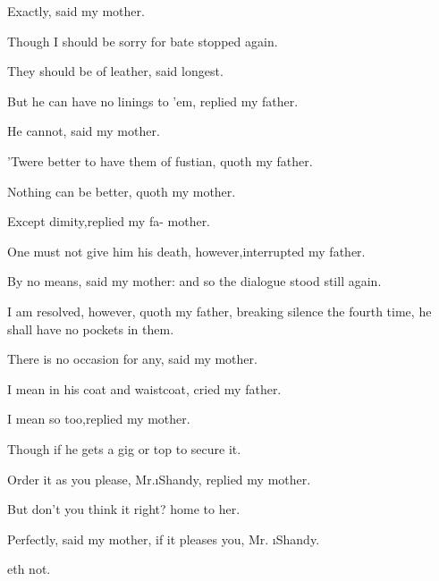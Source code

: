 \documentclass[twoside]{article}
\begin{document}
Exactly, said my mother.\tsh

\tshh Though I should be sorry for\break
{}
bate stopped again.

\tshh They should be of leather, said\break
{}
\parskip 10pt
longest.

But he can have no linings to ’em,\break
replied my father.\tsh

He cannot, said my mother.

’Twere better to have them of fustian,\break
quoth my father.

Nothing can be better, quoth my\break
mother.\tsh

\tshh Except dimity,\tsk replied my fa-\break 
{}
mother.

\tshh One must not give him his death,\break
however,\tsk interrupted my father.

By no means, said my mother:\tshh\break
and so the dialogue stood still again.

\parskip 12pt

\topstrut I am resolved, however, quoth my\break 
father, breaking silence the fourth time,\break
he shall have no pockets in them.\tsh

\tshh There is no occasion for any,\break
said my mother.\tsh

I mean in his coat and waistcoat,\tsk\break
cried my father.

\tshh I mean so too,\tsk replied my\break
mother.

\tshh Though if he gets a gig or top\break
{}
to secure it.\tsh

Order it as you please, Mr.\@ \i{Shandy}, replied my
mother.\tsh


\tshh But don’t you think it right?\break
{}
home to her.

Perfectly, said my mother, if it pleases\break
you, Mr. \i{Shandy.}\tsh

\tshh {}\break
{}
eth not.
\end{document}
